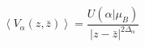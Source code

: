 \begin{equation}
\left\langle V_{\alpha}(z,\bar{z})\right\rangle
=\frac{U(\alpha|\mu_{B})}{\left| z-\bar{z}\right|
^{2\Delta_{\alpha}}} \label{onepoint} \nonumber
\end{equation}

